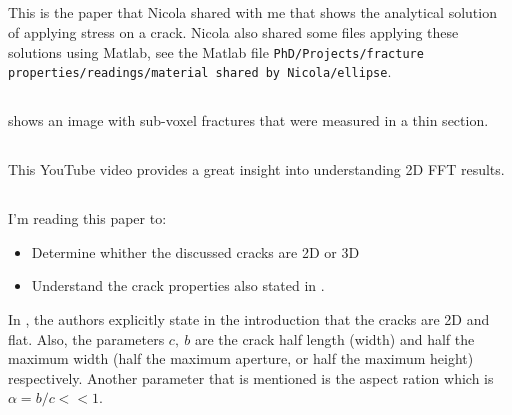 \documentclass[12pt,titlepage]{article}
\begin{document}
\subsection[Maugis (1992)]{\cite{Maugis1992}}
This is the paper that Nicola shared with me that shows the analytical solution of applying stress on a crack. Nicola also shared some files applying these solutions using Matlab, see the Matlab file \texttt{PhD/Projects/fracture properties/readings/material shared by Nicola/ellipse}.
 
\subsection[Ketcham and Carlson (2001)]{\cite{Ketcham2001}} 
\cite[fig. 6]{Ketcham2001} shows an image with sub-voxel fractures that were measured in a thin section.

\subsection[Cohen (2017)]{\cite{Cohen2017}}
This YouTube video provides a great insight into understanding 2D FFT results. 

\subsection[Mavko and Nur (1978)]{\cite{Mavko1978}}
I'm reading this paper to: 
\begin{itemize}
\item Determine whither the discussed cracks are 2D or 3D
\item Understand the crack properties also stated in \cite{Mavko2009}.
\end{itemize}

In \cite{Mavko1978}, the authors explicitly state in the introduction that the cracks are 2D and flat. Also, the parameters $c,~ b$ are the crack half length (width) and half the maximum width (half the maximum aperture, or half the maximum height) respectively. Another parameter that is mentioned is the aspect ration which is $\alpha = b/c << 1$. 
\clearpage
\newpage



\pagebreak
\appendix
{}
\end{document}
